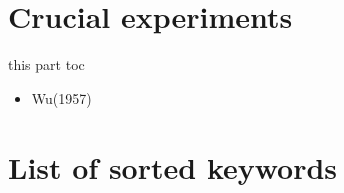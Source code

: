 \documentclass[10pt,xcolor={usenames},fleqn,mathserif,serif]{beamer}
\begin{document}
\part{Crucial experiments}
\begin{frame}{this part toc}
\begin{itemize}
\item Wu(1957)
\end{itemize}
\end{frame}


\part{List of sorted keywords}
\listofsortedkeywords
\end{document}
